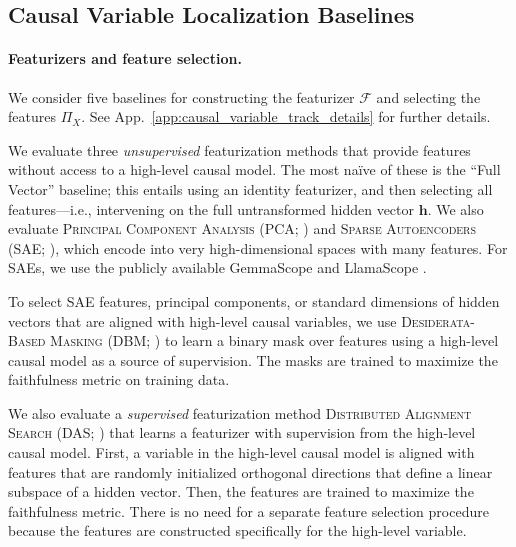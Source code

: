 \documentclass{article}
\theoremstyle{plain}
\theoremstyle{definition}
\theoremstyle{remark}
\begin{document}
\subsection{Causal Variable Localization Baselines}
\paragraph{Featurizers and feature selection.} We consider five baselines for constructing the featurizer $\mathcal{F}$ and selecting the features $\Pi_X$. 
See App.~\ref{app:causal_variable_track_details} for further details.

We evaluate three \textit{unsupervised} featurization methods that provide features without access to a high-level causal model. The most naïve of these is the ``Full Vector'' baseline; this entails using an identity featurizer, and then selecting all features---i.e., intervening on the full untransformed hidden vector $\mathbf{h}$. We also evaluate \textsc{Principal Component Analysis} (PCA; \citealt{tigges2023linearrepresentationssentimentlarge, marks2023geometry}) and \textsc{Sparse Autoencoders} (SAE; \citealt{bricken2023monosemanticity, cunningham2023sparse}), which encode into very high-dimensional spaces with many features. For SAEs, we use the publicly available GemmaScope \cite{Lieberum2024} and LlamaScope \cite{Llamascope}.  

To select SAE features, principal components, or standard dimensions of hidden vectors that are aligned with high-level causal variables, we use \textsc{Desiderata-Based Masking} (DBM; \citealt{Cao2020,Cao2022, Csordas2021, Davies2023, chaudhary2024evaluatingopensourcesparseautoencoders}) to learn a binary mask over features using a high-level causal model as a source of supervision. The masks are trained to maximize the faithfulness metric on training data.

We also evaluate a \textit{supervised} featurization method \textsc{Distributed Alignment Search} (DAS; \citealt{Geiger2024DAS}) that learns a featurizer with supervision from the high-level causal model. First, a variable in the high-level causal model is aligned with features that are randomly initialized orthogonal directions that define a linear subspace of a hidden vector. Then, the features are trained to maximize the faithfulness metric. There is no need for a separate feature selection procedure because the features are constructed specifically for the high-level variable.
\end{document}
